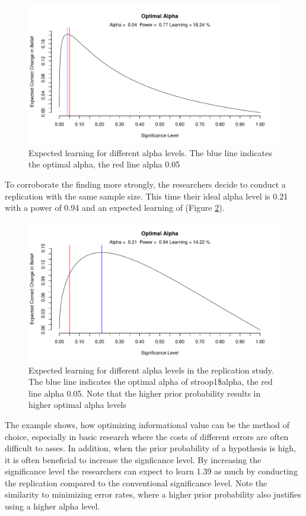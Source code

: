 \documentclass[
  english,
  ,jou,floatsintext]{apa6}
\begin{document}
\begin{figure}
\centering
\includegraphics{Justify_in_Practice_files/figure-latex/idealalpha1-1.pdf}
\caption{\label{fig:idealalpha1}Expected learning for different alpha levels. The blue line indicates the optimal alpha, the red line alpha 0.05}
\end{figure}

To corroborate the finding more strongly, the researchers decide to conduct a replication with the same sample size. This time their ideal alpha level is 0.21 with a power of 0.94 and an expected learning of (Figure \ref{fig:idealalpha2}).

\begin{figure}
\centering
\includegraphics{Justify_in_Practice_files/figure-latex/idealalpha2-1.pdf}
\caption{\label{fig:idealalpha2}Expected learning for different alpha levels in the replication study. The blue line indicates the optimal alpha of stroop1\$alpha, the red line alpha 0.05. Note that the higher prior probability results in higher optimal alpha levels}
\end{figure}

The example shows, how optimizing informational value can be the method of choice, especially in basic research where the costs of different errors are often difficult to asses. In addition, when the prior probability of a hypothesis is high, it is often beneficial to increase the signficance level. By increasing the significance level the researchers can expect to learn 1.39 as much by conducting the replication compared to the conventional significance level. Note the similarity to minimizing error rates, where a higher prior probability also justifies using a higher alpha level.
\end{document}
